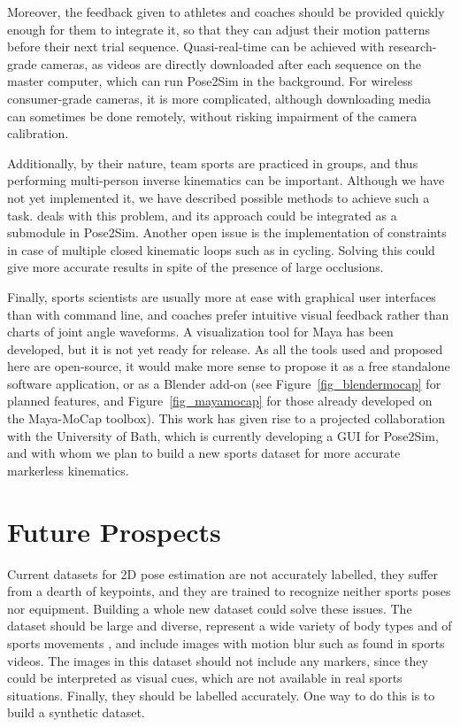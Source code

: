 Moreover, the feedback given to athletes and coaches should be provided quickly enough for them to integrate it, so that they can adjust their motion patterns before their next trial sequence. Quasi-real-time can be achieved with research-grade cameras, as videos are directly downloaded after each sequence on the master computer, which can run Pose2Sim in the background. For wireless consumer-grade cameras, it is more complicated, although downloading media can sometimes be done remotely, without risking impairment of the camera calibration. 

Additionally, by their nature, team sports are practiced in groups, and thus performing multi-person inverse kinematics can be important. Although we have not yet implemented it, we have described possible methods to achieve such a task. \cite{Easymocap2021} deals with this problem, and its approach could be integrated as a submodule in Pose2Sim. Another open issue is the implementation of constraints in case of multiple closed kinematic loops such as in cycling. Solving this could give more accurate results in spite of the presence of large occlusions.

Finally, sports scientists are usually more at ease with graphical user interfaces than with command line, and coaches prefer intuitive visual feedback rather than charts of joint angle waveforms. A visualization tool for Maya has been developed, but it is not yet ready for release. As all the tools used and proposed here are open-source, it would make more sense to propose it as a free standalone software application, or as a Blender add-on (see Figure~\ref{fig_blendermocap} for planned features, and Figure~\ref{fig_mayamocap} for those already developed on the Maya-MoCap toolbox). This work has given rise to a projected collaboration with the University of Bath, which is currently developing a GUI for Pose2Sim, and with whom we plan to build a new sports dataset for more accurate markerless kinematics. 


\section*{Future Prospects}
Current datasets for 2D pose estimation are not accurately labelled, they suffer from a dearth of keypoints, and they are trained to recognize neither sports poses nor equipment. Building a whole new dataset could solve these issues. The dataset should be large and diverse, represent a wide variety of body types and of sports movements \cite{Seethapathi2019}, and include images with motion blur such as found in sports videos. The images in this dataset should not include any markers, since they could be interpreted as visual cues, which are not available in real sports situations. Finally, they should be labelled accurately. One way to do this is to build a synthetic dataset. 

